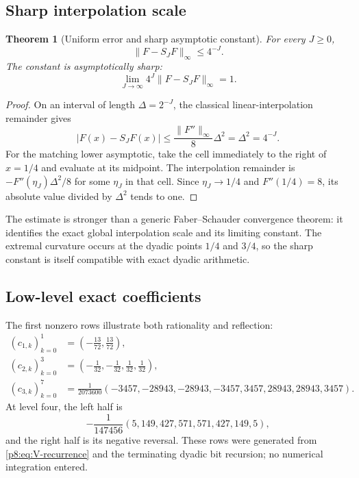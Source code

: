 \documentclass[11pt]{article}
\newtheorem{theorem}{Theorem}[section]
\theoremstyle{definition}
\theoremstyle{remark}
\begin{document}
\subsection{Sharp interpolation scale}

\begin{theorem}[Uniform error and sharp asymptotic constant]
\label{p8:thm:faber-error}
For every $J\ge0$,
\begin{equation}
 \|F-S_JF\|_\infty\le4^{-J}.                             \label{p8:eq:faber-error-bound}
\end{equation}
The constant is asymptotically sharp:
\begin{equation}
 \boxed{\displaystyle
 \lim_{J\to\infty}4^J\|F-S_JF\|_\infty=1.}              \label{p8:eq:faber-error-limit}
\end{equation}
\end{theorem}

\begin{proof}
On an interval of length $\Delta=2^{-J}$, the classical linear-interpolation
remainder gives
\[
 |F(x)-S_JF(x)|\le\frac{\|F''\|_\infty}{8}\Delta^2
 =\Delta^2=4^{-J}.
\]
For the matching lower asymptotic, take the cell immediately to the right of
$x=1/4$ and evaluate at its midpoint.  The interpolation remainder is
$-F''(\eta_J)\Delta^2/8$ for some $\eta_J$ in that cell.  Since
$\eta_J\to1/4$ and $F''(1/4)=8$, its absolute value divided by $\Delta^2$
tends to one.
\end{proof}

\begin{remark}
The estimate is stronger than a generic Faber--Schauder convergence theorem:
it identifies the exact global interpolation scale and its limiting constant.
The extremal curvature occurs at the dyadic points $1/4$ and $3/4$, so the
sharp constant is itself compatible with exact dyadic arithmetic.
\end{remark}

\subsection{Low-level exact coefficients}

The first nonzero rows illustrate both rationality and reflection:
\begin{align}
 (c_{1,k})_{k=0}^{1}
   &=\left(-\frac{13}{72},\frac{13}{72}\right),          \label{p8:eq:faber-row1}\\
 (c_{2,k})_{k=0}^{3}
   &=\left(-\frac1{32},-\frac1{32},\frac1{32},\frac1{32}\right), \label{p8:eq:faber-row2}\\
 (c_{3,k})_{k=0}^{7}
   &=\frac1{2073600}
     (-3457,-28943,-28943,-3457,3457,28943,28943,3457).  \label{p8:eq:faber-row3}
\end{align}
At level four, the left half is
\begin{equation}
 -\frac1{147456}(5,149,427,571,571,427,149,5),            \label{p8:eq:faber-row4}
\end{equation}
and the right half is its negative reversal.  These rows were generated from
\eqref{p8:eq:V-recurrence} and the terminating dyadic bit recursion; no numerical
integration entered.
\end{document}
